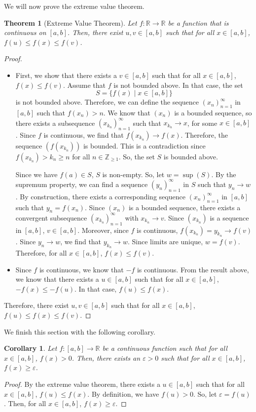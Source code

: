 \documentclass[a4paper, openany]{memoir}
\theoremstyle{definition}
\theoremstyle{plain}
\newtheorem{theorem}[definition]{Theorem}
\newtheorem{corollary}[definition]{Corollary}
\begin{document}
We will now prove the extreme value theorem.
\begin{theorem}[Extreme Value Theorem]
Let $f: \mathbb{R} \to \mathbb{R}$ be a function that is continuous on $[a, b]$. Then, there exist $u, v \in [a, b]$ such that for all $x \in [a, b]$, $f(u) \leqslant f(x) \leqslant f(v)$.
\end{theorem}
\begin{proof}
\hspace*{0pt}
\begin{itemize}
    \item First, we show that there exists a $v \in [a, b]$ such that for all $x \in [a, b]$, $f(x) \leqslant f(v)$. Assume that $f$ is not bounded above. In that case, the set
    \[S = \{f(x) \mid x \in [a, b]\}\]
    is not bounded above. Therefore, we can define the sequence $(x_n)_{n=1}^{\infty}$ in $[a, b]$ such that $f(x_n) > n$. We know that $(x_n)$ is a bounded sequence, so there exists a subsequence $(x_{k_n})_{n=1}^{\infty}$ such that $x_{k_n} \to x$, for some $x \in [a, b]$. Since $f$ is continuous, we find that $f(x_{k_n}) \to f(x)$. Therefore, the sequence $(f(x_{k_n}))$ is bounded. This is a contradiction since $f(x_{k_n}) > k_n \geqslant n$ for all $n \in \mathbb{Z}_{\geqslant 1}$. So, the set $S$ is bounded above.
    
    Since we have $f(a) \in S$, $S$ is non-empty. So, let $w = \sup (S)$. By the supremum property, we can find a sequence $(y_n)_{n=1}^{\infty}$ in $S$ such that $y_n \to w$. By construction, there exists a corresponding sequence $(x_n)_{n=1}^{\infty}$ in $[a, b]$ such that $y_n = f(x_n)$. Since $(x_n)$ is a bounded sequence, there exists a convergent subsequence $(x_{k_n})_{n=1}^{\infty}$ with $x_{k_n} \to v$. Since $(x_{k_n})$ is a sequence in $[a, b]$, $v \in [a, b]$. Moreover, since $f$ is continuous, $f(x_{k_n}) = y_{k_n} \to f(v)$. Since $y_n \to w$, we find that $y_{k_n} \to w$. Since limits are unique, $w = f(v)$. Therefore, for all $x \in [a, b]$, $f(x) \leqslant f(v)$.
    
    \item Since $f$ is continuous, we know that $-f$ is continuous. From the result above, we know that there exists a $u \in [a, b]$ such that for all $x \in [a, b]$, $-f(x) \leqslant -f(u)$. In that case, $f(u) \leqslant f(x)$.
\end{itemize}
Therefore, there exist $u, v \in [a, b]$ such that for all $x \in [a, b]$, $f(u) \leqslant f(x) \leqslant f(v)$.
\end{proof}
\noindent We finish this section with the following corollary.
\begin{corollary}
Let $f: [a, b] \to \mathbb{R}$ be a continuous function such that for all $x \in [a, b]$, $f(x) > 0$. Then, there exists an $\varepsilon > 0$ such that for all $x \in [a, b]$, $f(x) \geqslant \varepsilon$.
\end{corollary}
\begin{proof}
By the extreme value theorem, there exists a $u \in [a, b]$ such that for all $x \in [a, b]$, $f(u) \leqslant f(x)$. By definition, we have $f(u) > 0$. So, let $\varepsilon = f(u)$. Then, for all $x \in [a, b]$, $f(x) \geqslant \varepsilon$.
\end{proof}
\end{document}
